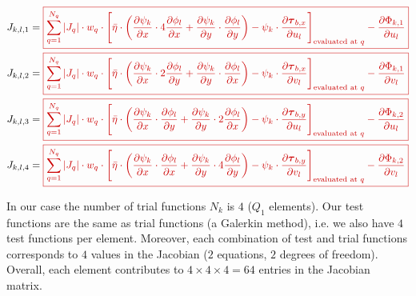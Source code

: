 \documentclass{amsart}
\newcommand{\T}{\boldsymbol{\tau}}
\newcommand{\diff}[2]{\ensuremath{\frac{\partial #1}{\partial #2}}}
\newcommand{\sumQ}{\ensuremath{\sum_{q = 1}^{N_q}}}
\newcommand{\basalshearstress}[1]{\T_{b#1}}
\newcommand{\taubx}{\basalshearstress{,x}}
\newcommand{\tauby}{\basalshearstress{,y}}
\newcommand{\highlight}[1]{{\color{red!80!black} \fbox{$ \displaystyle #1 $} }}
\begin{document}
\begin{align}
  J_{k,l,1} &= \highlight{
              \begin{aligned}[t]
                \sumQ |J_q| \cdot w_q\cdot \Bigg[& \bar\eta\cdot \left( \diff{\psi_k}{x}\cdot 4 \diff{\phi_l}{x} + \diff{\psi_k}{y}\cdot \diff{\phi_l}{y} \right)
                - \psi_k\cdot \diff{\taubx}{u_l} \Bigg]_{\text{evaluated at } q} - \diff{\Phi_{k,1}}{u_{l}}\\
              \end{aligned} }\\
  J_{k,l,2} &= \highlight{
              \begin{aligned}[t]
                \sumQ |J_q| \cdot w_q\cdot \Bigg[ &  \bar\eta\cdot \left( \diff{\psi_k}{x}\cdot 2 \diff{\phi_l}{y} + \diff{\psi_k}{y}\cdot \diff{\phi_l}{x} \right)
                - \psi_k\cdot \diff{\taubx}{v_l} \Bigg]_{\text{evaluated at } q} - \diff{\Phi_{k,1}}{v_{l}}\\
              \end{aligned} }\\
  J_{k,l,3} &= \highlight{
              \begin{aligned}[t]
                \sumQ |J_q| \cdot w_q\cdot \Bigg[& \bar\eta\cdot \left( \diff{\psi_k}{x}\cdot \diff{\phi_l}{y} + \diff{\psi_k}{y}\cdot 2 \diff{\phi_l}{x} \right)
                - \psi_k\cdot \diff{\tauby}{u_l} \Bigg]_{\text{evaluated at } q} - \diff{\Phi_{k,2}}{u_{l}}\\
              \end{aligned} }\\
  J_{k,l,4} &= \highlight{
              \begin{aligned}[t]
                \sumQ |J_q| \cdot w_q\cdot \Bigg[& \bar\eta\cdot \left( \diff{\psi_k}{x}\cdot \diff{\phi_l}{x} + \diff{\psi_k}{y}\cdot 4 \diff{\phi_l}{y} \right)
                - \psi_k\cdot \diff{\tauby}{v_l} \Bigg]_{\text{evaluated at } q} - \diff{\Phi_{k,2}}{v_{l}}\\
              \end{aligned} }
\end{align}

In our case the number of trial functions $N_k$ is $4$ ($Q_1$ elements). Our test functions are the same as trial functions (a Galerkin method), i.e. we also have $4$ test functions per element. Moreover, each combination of test and trial functions corresponds to $4$ values in the Jacobian ($2$ equations, $2$ degrees of freedom). Overall, each element contributes to $4 \times 4 \times 4 = 64$ entries in the Jacobian matrix.
\end{document}
